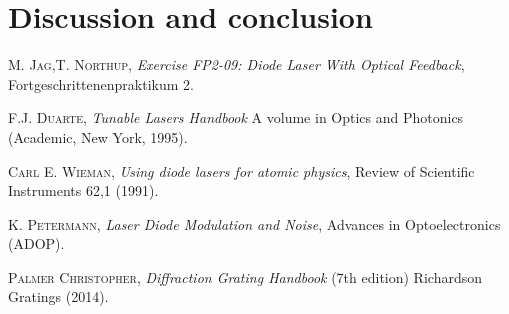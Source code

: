 \documentclass[a4paper,10pt]{article}
\begin{document}
\section{Discussion and conclusion}


\begin{thebibliography}{99}
\textsc{M. Jag,T. Northup}, \textit{Exercise FP2-09: Diode Laser With Optical Feedback}, Fortgeschrittenenpraktikum 2.

\textsc{F.J. Duarte}, \textit{Tunable Lasers Handbook} A volume in Optics and Photonics (Academic, New York, 1995). 

 \textsc{Carl E. Wieman}, \textit{Using diode lasers for atomic physics}, Review of Scientific Instruments 62,1 (1991).
 
    \textsc{K. Petermann}, \textit{Laser Diode Modulation and Noise}, Advances in Optoelectronics (ADOP).

\textsc{Palmer Christopher}, \textit{Diffraction Grating Handbook} (7th edition) Richardson Gratings (2014). 

\end{thebibliography}
\end{document}
